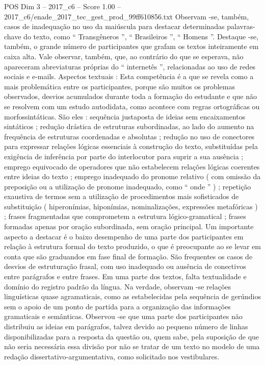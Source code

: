 \begin{textsample}{POS Dim 3 – 2017\_c6 – Score 1.00 – 2017\_c6/enade\_2017\_tec\_gest\_prod\_99ff610856.txt}
Observam -se, também, casos de inadequação no uso da maiúscula para destacar determinadas palavras-chave do texto, como “ Transgêneros ”, “ Brasileiros ”, “ Homens ”.
Destaque -se, também, o grande número de participantes que grafam os textos inteiramente em caixa alta.
Vale observar, também, que, ao contrário do que se esperava, não apareceram abreviaturas próprias do “ internetês ”, relacionadas ao uso de redes sociais e e-mails.
Aspectos textuais : Esta competência é a que se revela como a mais problemática entre os participantes, porque são muitos os problemas observados, desvios acumulados durante toda a formação do estudante e que não se resolvem com um estudo autodidata, como acontece com regras ortográficas ou morfossintáticas.
São eles : sequência justaposta de ideias sem encaixamentos sintáticos ; redução drástica de estruturas subordinadas, ao lado do aumento na frequência de estruturas coordenadas e absolutas ; redução no uso de conectores para expressar relações lógicas essenciais à construção do texto, substituídas pela exigência de inferência por parte do interlocutor para suprir a sua ausência ; emprego equivocado de operadores que não estabelecem relações lógicas coerentes entre ideias do texto ; emprego inadequado do pronome relativo ( com omissão da preposição ou a utilização de pronome inadequado, como “ onde ” ) ; repetição exaustiva de termos sem a utilização de procedimentos mais sofisticados de substituição ( hiperonímias, hiponímias, nominalizações, expressões metafóricas ) ; frases fragmentadas que comprometem a estrutura lógico-gramatical ; frases formadas apenas por oração subordinada, sem oração principal.
Um importante aspecto a destacar é o baixo desempenho de uma parte dos participantes em relação à estrutura formal do texto produzido, o que é preocupante ao se levar em conta que são graduandos em fase final de formação.
São frequentes os casos de desvios de estruturação frasal, com uso inadequado ou ausência de conectivos entre parágrafos e entre frases.
Em uma parte dos textos, falta textualidade e domínio do registro padrão da língua.
Na verdade, observam -se relações linguísticas quase agramaticais, como as estabelecidas pela sequência de gerúndios sem o apoio de um ponto de partida para a organização das informações gramaticais e semânticas.
Observou -se que uma parte dos participantes não distribuiu as ideias em parágrafos, talvez devido ao pequeno número de linhas disponibilizadas para a resposta da questão ou, quem sabe, pela suposição de que não seria necessária essa divisão por não se tratar de um texto no modelo de uma redação dissertativo-argumentativa, como solicitado nos vestibulares.

\end{textsample}
